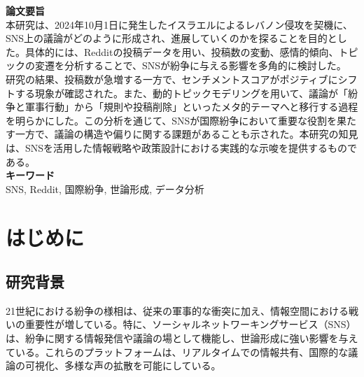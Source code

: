 \documentclass[11pt, a4j]{jreport}
\begin{document}
    \noindent
    {\Large \textbf{論文要旨}} \\[5mm]
    \quad 本研究は、2024年10月1日に発生したイスラエルによるレバノン侵攻を契機に、SNS上の議論がどのように形成され、進展していくのかを探ることを目的とした。具体的には、Redditの投稿データを用い、投稿数の変動、感情的傾向、トピックの変遷を分析することで、SNSが紛争に与える影響を多角的に検討した。\\
    \quad 研究の結果、投稿数が急増する一方で、センチメントスコアがポジティブにシフトする現象が確認された。また、動的トピックモデリングを用いて、議論が「紛争と軍事行動」から「規則や投稿削除」といったメタ的テーマへと移行する過程を明らかにした。この分析を通じて、SNSが国際紛争において重要な役割を果たす一方で、議論の構造や偏りに関する課題があることも示された。本研究の知見は、SNSを活用した情報戦略や政策設計における実践的な示唆を提供するものである。 \\[20mm]
    
    \noindent
    {\Large \textbf{キーワード}} \\[5mm]
    SNS, Reddit, 国際紛争, 世論形成, データ分析

    {\makeatletter
    \let\ps@jpl@in\ps@empty
    \makeatother
    \pagestyle{empty}
    \tableofcontents
    \clearpage}
    \pagestyle{plain}
    \lhead{\rightmark}
    \renewcommand{\chaptermark}[1]{\markboth{第\ \normalfont\thechapter\ 章~~#1}{}}

    \chapter{はじめに} %
    \setcounter{page}{1} %

    \section{研究背景}

    21世紀における紛争の様相は、従来の軍事的な衝突に加え、情報空間における戦いの重要性が増している。特に、ソーシャルネットワーキングサービス（SNS）は、紛争に関する情報発信や議論の場として機能し、世論形成に強い影響を与えている。これらのプラットフォームは、リアルタイムでの情報共有、国際的な議論の可視化、多様な声の拡散を可能にしている。
\end{document}
